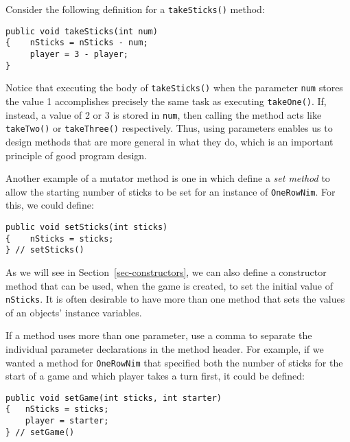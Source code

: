 \noindent Consider the following definition for a {\tt takeSticks()} method:

\begin{jjjlisting}
\begin{lstlisting}
public void takeSticks(int num)
{    nSticks = nSticks - num;
     player = 3 - player;
}
\end{lstlisting}
\end{jjjlisting}

\noindent Notice that executing the body of {\tt takeSticks()}
when the parameter {\tt num} stores the value 1 accomplishes precisely
the same task as executing {\tt takeOne()}. If, instead, a value of 2 or
3 is stored in {\tt num}, then calling the method acts like {\tt takeTwo()}
or {\tt takeThree()} respectively.  Thus, using parameters enables us to
design methods that are more general in what they do, which is an important
principle of good program design.

Another example of a mutator method is one in which define a {\it set
method} to allow the starting number of sticks to be set for an
instance of {\tt OneRowNim}. For this, we could define:

\label{meth-setsticks}

\begin{jjjlisting}
\begin{lstlisting}
public void setSticks(int sticks)
{    nSticks = sticks;
} // setSticks()
\end{lstlisting}
\end{jjjlisting}

\noindent As we will see in Section~\ref{sec-constructors}, 
we can also define a constructor method that can be used, when the
game is created, to set the initial value of {\tt nSticks}. It is
often desirable to have more than one method that sets the values of
an objects' instance variables.

If a method uses more than one parameter, use a comma to separate the
individual parameter declarations in the method header.  For example,
if we wanted a method for {\tt OneRowNim} that specified both the
number of sticks for the start of a game and which player takes a turn
first, it could be defined: 

\begin{jjjlisting}
\begin{lstlisting}
public void setGame(int sticks, int starter) 
{   nSticks = sticks; 
    player = starter; 
} // setGame()
\end{lstlisting}
\end{jjjlisting}


